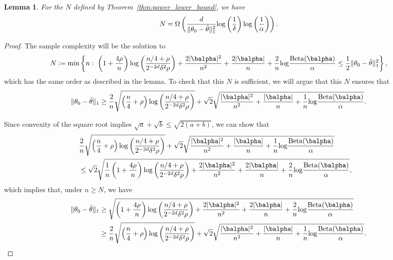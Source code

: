 \documentclass[11pt]{article}
\def\log{{\rm log}}
\newcommand{\Beta}{\mathrm{Beta}}
\newtheorem{lemma}{Lemma}[section]
\newcommand{\df}{\vcentcolon=}
\newcommand{\pfrac}[2]{\left(\frac{#1}{#2}\right)}
\begin{document}
\begin{lemma}
  For the $N$ defined by Theorem~\ref{thm:power_lower_bound}, we have
  \begin{equation*}
    N = \Omega\left(
      \frac{d}{\Vert \theta_0- \tilde\theta\Vert_{1}^2}
\log\pfrac{1}{\delta}\log\pfrac{1}{\alpha}
    \right).
  \end{equation*}
\end{lemma}
\begin{proof}
The sample complexity will be the solution to
\[
  N \df
  \min
  \left\{
    n:\;
      \left(1 + \frac{4\rho}{n}\right)
      \log\pfrac{n/4+\rho}{2^{-2d}\delta^2 \rho}
    +
      \frac{2|\balpha|^2}{n^2} + \frac{2|\balpha|}{n}
      +
    \frac{2}{n}\log\frac{\Beta(\balpha)}{\alpha}
    \leq
    \frac{1}{2}\Vert \theta_0- \tilde\theta\Vert_{1}^2
  \right\},
\]
  which has the same order as described in the lemma. To check that this $N$ is sufficient, we will argue that this $N$ ensures that
  \begin{equation}\label{eqn:n.bound}
    \Vert \theta_0- \tilde\theta\Vert_{1}
    \geq
    \frac{2}{n}\sqrt{\left(\frac{n}{4} + \rho\right)
      \log\pfrac{n/4+\rho}{2^{-2d}\delta^2 \rho}}
    + \sqrt{2}\sqrt{
      \frac{|\balpha|^2}{n^2} + \frac{|\balpha|}{n}
      +
      \frac{1}{n}\log\frac{\Beta(\balpha)}{\alpha}
    }.
\end{equation}  

Since convexity of the square root implies  $\sqrt{a}+\sqrt{b}\leq\sqrt{2(a+b)}$, we can show that
\begin{align*}
    \lefteqn{\frac{2}{n}\sqrt{\left(\frac{n}{4} + \rho\right)
      \log\pfrac{n/4+\rho}{2^{-2d}\delta^2 \rho}}
    + \sqrt{2}\sqrt{
      \frac{|\balpha|^2}{n^2} + \frac{|\balpha|}{n}
      +
      \frac{1}{n}\log\frac{\Beta(\balpha)}{\alpha}
  }}\\
  &\leq
    \sqrt{2}
      \sqrt{\frac{1}{n}\left(1 + \frac{4\rho}{n}\right)
      \log\pfrac{n/4+\rho}{2^{-2d}\delta^2 \rho}
    +
      \frac{2|\balpha|^2}{n^2} + \frac{2|\balpha|}{n}
      +
    \frac{2}{n}\log\frac{\Beta(\balpha)}{\alpha}
    },
\end{align*}
which implies that, under $n \geq N$, we have
\begin{align*}
    \Vert \theta_0- \tilde\theta\Vert_{1}
  &\geq
    \sqrt{
    \left(1 + \frac{4\rho}{n}\right)
      \log\pfrac{n/4+\rho}{2^{-2d}\delta^2 \rho}
    +
      \frac{2|\balpha|^2}{n^2} + \frac{2|\balpha|}{n}
      +
    \frac{2}{n}\log\frac{\Beta(\balpha)}{\alpha}
    }\\
    &\geq
      \frac{2}{n}\sqrt{\left(\frac{n}{4} + \rho\right)
      \log\pfrac{n/4+\rho}{2^{-2d}\delta^2 \rho}}
    + \sqrt{2}\sqrt{
      \frac{|\balpha|^2}{n^2} + \frac{|\balpha|}{n}
      +
      \frac{1}{n}\log\frac{\Beta(\balpha)}{\alpha}
      }.
\end{align*}
\end{proof}
\end{document}
